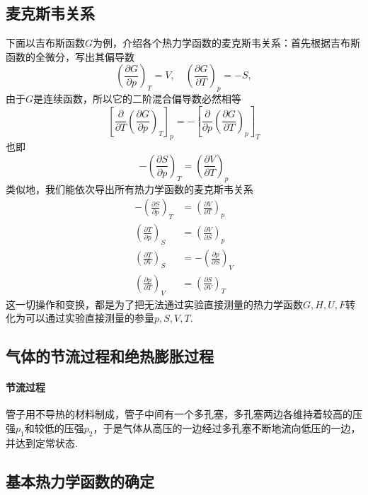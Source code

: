 \subsection{麦克斯韦关系}
下面以吉布斯函数$G$为例，介绍各个热力学函数的麦克斯韦关系：首先根据吉布斯函数的全微分，写出其偏导数
$$
    \left(\frac{\partial G}{\partial p}\right)_T=V, \quad
    \left(\frac{\partial G}{\partial T}\right)_p=-S,
$$
由于$G$是连续函数，所以它的二阶混合偏导数必然相等
$$
    \left[\frac{\partial}{\partial T}\left(\frac{\partial G}{\partial p}\right)_T\right]_p = -\left[\frac{\partial}{\partial p}\left(\frac{\partial G}{\partial T}\right)_p\right]_T
$$
也即
$$
    -\left(\frac{\partial S}{\partial p}\right)_T=\left(\frac{\partial V}{\partial T}\right)_p
$$
类似地，我们能依次导出所有热力学函数的麦克斯韦关系
\begin{align}\label{麦克斯韦关系}
    -\left(\frac{\partial S}{\partial p}\right)_T & = \left(\frac{\partial V}{\partial T}\right)_p  \\
    \left(\frac{\partial T}{\partial p}\right)_S  & = \left(\frac{\partial V}{\partial S}\right)_p  \\
    \left(\frac{\partial T}{\partial V}\right)_S  & = -\left(\frac{\partial p}{\partial S}\right)_V \\
    \left(\frac{\partial p}{\partial T}\right)_V  & = \left(\frac{\partial S}{\partial V}\right)_T
\end{align}
这一切操作和变换，都是为了把无法通过实验直接测量的热力学函数$G, H, U, F$转化为可以通过实验直接测量的参量$p, S, V, T$.



\subsection{气体的节流过程和绝热膨胀过程}
\paragraph{节流过程}管子用不导热的材料制成，管子中间有一个多孔塞，多孔塞两边各维持着较高的压强$p_1$和较低的压强$p_2$，于是气体从高压的一边经过多孔塞不断地流向低压的一边，并达到定常状态.


\subsection{基本热力学函数的确定}